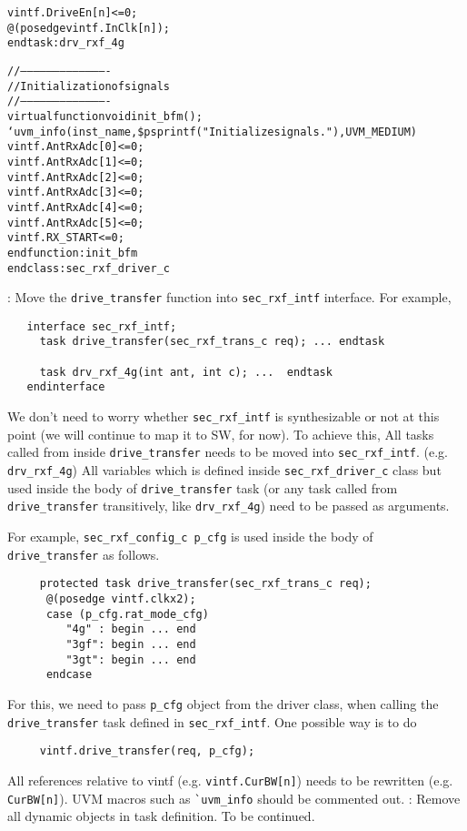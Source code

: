 \documentclass{note}
\begin{document}
\begin{alltt}
           vintf.DriveEn[n] <= 0;
           @(posedge vintf.InClk[n]);
   endtask: drv_rxf_4g

   //----------------------------------------
   // Initialization of signals
   //----------------------------------------
   virtual function void init_bfm();
      `uvm_info(inst_name, \$psprintf("Initialize signals."), UVM_MEDIUM)
      vintf.AntRxAdc[0] <= 0;
      vintf.AntRxAdc[1] <= 0;
      vintf.AntRxAdc[2] <= 0;
      vintf.AntRxAdc[3] <= 0;
      vintf.AntRxAdc[4] <= 0;
      vintf.AntRxAdc[5] <= 0;
      vintf.RX_START <= 0;
   endfunction: init_bfm
endclass: sec_rxf_driver_c
\end{alltt}

\w {}: Move the \verb+drive_transfer+ function into
\verb+sec_rxf_intf+ interface. 
  \bit
  \w For example,
  \begin{verbatim}
   interface sec_rxf_intf;
     task drive_transfer(sec_rxf_trans_c req); ... endtask

     task drv_rxf_4g(int ant, int c); ...  endtask
   endinterface
  \end{verbatim}
  \w We don't need to worry whether \verb+sec_rxf_intf+ is synthesizable or not
  at this point (we will continue to map it to SW, for now).
  \w To achieve this, 
     \ben
     \w All tasks called from inside \verb+drive_transfer+ needs to be
        moved into \verb+sec_rxf_intf+. (e.g. \verb+drv_rxf_4g+)
     \w All variables which is defined inside \verb+sec_rxf_driver_c+ class
     but used inside the body of \verb+drive_transfer+ task (or any task
     called from \verb+drive_transfer+ transitively, like \verb+drv_rxf_4g+)
     need to be passed as arguments.

     For example, \verb+sec_rxf_config_c p_cfg+ is used inside the body of 
     \verb+drive_transfer+ as follows.

    \begin{verbatim}
     protected task drive_transfer(sec_rxf_trans_c req);
      @(posedge vintf.clkx2);
      case (p_cfg.rat_mode_cfg)
         "4g" : begin ... end
         "3gf": begin ... end
         "3gt": begin ... end
      endcase
     \end{verbatim}
     For this, we need to pass \verb+p_cfg+ object from the driver class, when
     calling the \verb+drive_transfer+ task defined in \verb+sec_rxf_intf+. 
     One possible way is to do
     \begin{verbatim}
     vintf.drive_transfer(req, p_cfg);
     \end{verbatim}
    \w All references relative to vintf (e.g. \verb+vintf.CurBW[n]+) needs
       to be rewritten (e.g. \verb+CurBW[n]+).
    \w UVM  macros such as \verb+`uvm_info+ should be commented out.
    \een
  \w {}
  \eit
\w {}: Remove all dynamic objects in task definition.
   \bit
   \w To be continued.
   \eit
\eit
\end{document}
